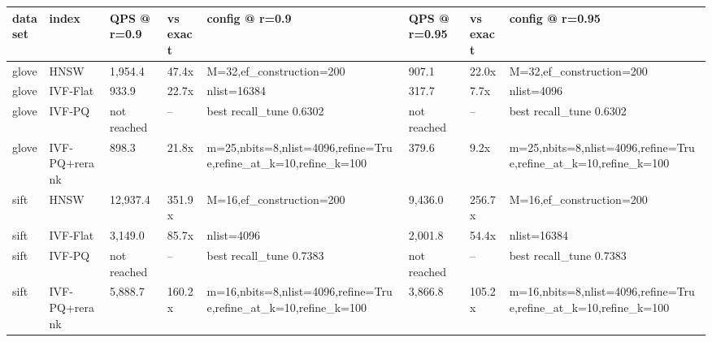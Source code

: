 \begin{tabular}{llllllll}
\hline
dataset & index & QPS @ r=0.9 & vs exact & config @ r=0.9 & QPS @ r=0.95 & vs exact & config @ r=0.95 \\
\hline
glove & HNSW & 1,954.4 & 47.4x & M=32,ef\_construction=200 & 907.1 & 22.0x & M=32,ef\_construction=200 \\
glove & IVF-Flat & 933.9 & 22.7x & nlist=16384 & 317.7 & 7.7x & nlist=4096 \\
glove & IVF-PQ & not reached & -- & best recall\_tune 0.6302 & not reached & -- & best recall\_tune 0.6302 \\
glove & IVF-PQ+rerank & 898.3 & 21.8x & m=25,nbits=8,nlist=4096,refine=True,refine\_at\_k=10,refine\_k=100 & 379.6 & 9.2x & m=25,nbits=8,nlist=4096,refine=True,refine\_at\_k=10,refine\_k=100 \\
sift & HNSW & 12,937.4 & 351.9x & M=16,ef\_construction=200 & 9,436.0 & 256.7x & M=16,ef\_construction=200 \\
sift & IVF-Flat & 3,149.0 & 85.7x & nlist=4096 & 2,001.8 & 54.4x & nlist=16384 \\
sift & IVF-PQ & not reached & -- & best recall\_tune 0.7383 & not reached & -- & best recall\_tune 0.7383 \\
sift & IVF-PQ+rerank & 5,888.7 & 160.2x & m=16,nbits=8,nlist=4096,refine=True,refine\_at\_k=10,refine\_k=100 & 3,866.8 & 105.2x & m=16,nbits=8,nlist=4096,refine=True,refine\_at\_k=10,refine\_k=100 \\
\hline
\end{tabular}
